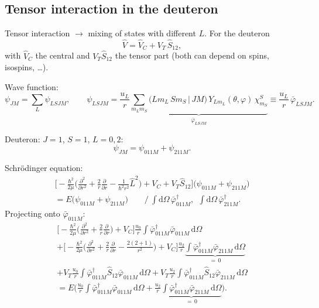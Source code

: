 \documentclass[11pt,a4paper]{article}
\newcommand{\op}[1]{\hat{#1}}
\newcommand{\ud}{\mathrm{d}}
\begin{document}
\subsection{Tensor interaction in the deuteron}

Tensor interaction $\to$ mixing of states with different $L$. For the deuteron
\[
\op V=\op V_C+V_T\,\op S_{12},
\]
with $\op V_C$ the central and $V_T\op S_{12}$ the tensor part (both can depend
on spins, isospins, \dots).

Wave function:
\[
\psi_{JM}=\sum_L\psi_{LSJM},
\qquad
\psi_{LSJM}=\frac{u_L}{r}\underbrace{\sum_{m_Lm_S}\big(Lm_L\,Sm_S\,|\,JM\big)\,
Y_{Lm_L}(\theta,\varphi)\,\chi^S_{m_S}}_{\displaystyle\bar\varphi_{LSJM}}
\equiv\frac{u_L}{r}\,\bar\varphi_{LSJM} .
\]

Deuteron: $J=1$, $S=1$, $L=0,2$:
\[
\psi_{JM}=\psi_{011M}+\psi_{211M}.
\]

Schr\"odinger equation:
\begin{multline*}
\Big[-\frac{\hbar^2}{2\mu}\Big(\frac{\partial^2}{\partial r^2}+\frac2r\frac{\partial}{\partial r}
-\frac{1}{\hbar^2r^2}\op L^2\Big)+V_C+V_T\op S_{12}\Big]\big(\psi_{011M}+\psi_{211M}\big)\\
=E\big(\psi_{011M}+\psi_{211M}\big)
\qquad\Big/\ \int\!\ud\Omega\,\bar\varphi^\dagger_{011M},\ \ \int\!\ud\Omega\,\bar\varphi^\dagger_{211M}.
\end{multline*}
Projecting onto $\bar\varphi_{011M}$:
\begin{multline*}
\Big[-\frac{\hbar^2}{2\mu}\Big(\frac{\partial^2}{\partial r^2}+\frac2r\frac{\partial}{\partial r}\Big)+V_C\Big]
\frac{u_0}{r}\int\bar\varphi^\dagger_{011M}\bar\varphi_{011M}\,\ud\Omega\\
+\Big[-\frac{\hbar^2}{2\mu}\Big(\frac{\partial^2}{\partial r^2}+\frac2r\frac{\partial}{\partial r}
-\frac{2(2+1)}{r^2}\Big)+V_C\Big]\frac{u_2}{r}
\underbrace{\int\bar\varphi^\dagger_{011M}\bar\varphi_{211M}\,\ud\Omega}_{=\,0}\\
+V_T\frac{u_0}{r}\int\bar\varphi^\dagger_{011M}\op S_{12}\bar\varphi_{011M}\,\ud\Omega
+V_T\frac{u_2}{r}\int\bar\varphi^\dagger_{011M}\op S_{12}\bar\varphi_{211M}\,\ud\Omega\\
=E\Big(\frac{u_0}{r}\int\bar\varphi^\dagger_{011M}\bar\varphi_{011M}\,\ud\Omega
+\frac{u_2}{r}\underbrace{\int\bar\varphi^\dagger_{011M}\bar\varphi_{211M}\,\ud\Omega}_{=\,0}\Big).
\end{multline*}
\end{document}
